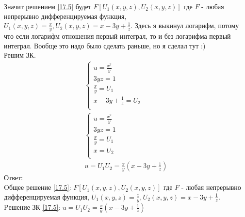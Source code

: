 \documentclass{article}
\begin{document}
Значит решением \ref{17.5} будет $F[U_1(x,y,z),U_2(x,y,z)]$ где $F$ - любая непрерывно дифференцируемая функция, $U_1(x,y,z)=\frac{x}{y}, U_2(x,y,z)=x-3y+\frac{1}{z}$. Здесь я выкинул логарифм, потому что если логарифм отношения первый интеграл, то и без логарифма первый интеграл. Вообще это надо было сделать раньше, но я сделал тут :)\\
Решим ЗК.
\begin{gather*}
\begin{cases}
        u=\frac{x^2}{y}\\
        3yz=1\\
        \frac{x}{y}=U_1\\
        x-3y+\frac{1}{z}=U_2\\
    \end{cases}    \\
    \begin{cases}
    u=\frac{x^2}{y}\\
        3yz=1\\
        \frac{x}{y}=U_1\\
        x=U_2\\
    \end{cases}    \\
    u=U_1 U_2= \frac{x}{y}(x-3y+\frac{1}{z})
\end{gather*}
Ответ:\\
 Oбщее решение \ref{17.5}: $F[U_1(x,y,z),U_2(x,y,z)]$ где $F$ - любая непрерывно дифференцируемая функция, $U_1(x,y,z)=\frac{x}{y}, U_2(x,y,z)=x-3y+\frac{1}{z}$.\\
 Pешение ЗК \ref{17.5}: $u=U_1 U_2= \frac{x}{y}(x-3y+\frac{1}{z})$
\end{document}
